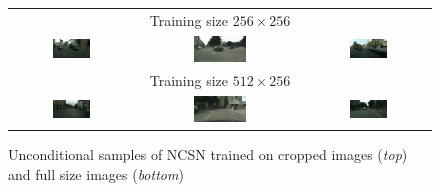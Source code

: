 \begin{figure}[] \label{tab:5.3}
    \centering
    \setlength\tabcolsep{-2pt}
    \begin{tabular}{ccc}
        & Training size $256\times256$ & \\
        \includegraphics[width=0.33\textwidth]{Chapters/figures/experiments/crop/1_sample.png} &
        \includegraphics[width=0.33\textwidth]{Chapters/figures/experiments/crop/5_sample.png} &
        \includegraphics[width=0.33\textwidth]{Chapters/figures/experiments/crop/8_sample.png}\\
        & Training size $512\times256$ & \\ 
        \includegraphics[width=0.33\textwidth]{Chapters/figures/experiments/crop/0_uncond_sample.png} &
        \includegraphics[width=0.33\textwidth]{Chapters/figures/experiments/crop/3_uncond_sample.png} &
        \includegraphics[width=0.33\textwidth]{Chapters/figures/experiments/crop/7_uncond_sample.png}
    \end{tabular}
    \caption[Unconditional samples of NCSN trained on cropped images and full size images]{Unconditional samples of NCSN trained on cropped images (\textit{top}) and full size images (\textit{bottom})}
\end{figure}

